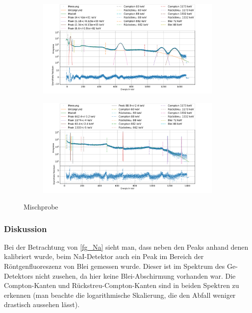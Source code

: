 \documentclass[
	a4paper,
	12pt,
	pagesize,
	ngerman
]{scrartcl}
\begin{document}
\begin{figure}[H]
		\centering
		\begin{subfigure}[c]{\textwidth}
			\centering
			\includegraphics[width= 1 \linewidth]{img/MixNa.pdf}
		\label{fg_Mix_Na}
		\end{subfigure}
		\begin{subfigure}[c]{\textwidth}
			\centering
			\includegraphics[width= 1 \linewidth]{img/MixGe.pdf}
		\label{fg_Mix_Ge}
		\end{subfigure}
		\caption{Mischprobe}
		\label{fg_Mix}
	\end{figure}

\subsubsection{Diskussion}

Bei der Betrachtung von \cref{fg_Na} sieht man, dass neben den Peaks anhand denen kalibriert wurde, beim NaI-Detektor auch ein Peak im Bereich der Röntgenfluoreszenz von Blei gemessen wurde.
Dieser ist im Spektrum des Ge-Detektors nicht zusehen, da hier keine Blei-Abschirmung vorhanden war.
Die Compton-Kanten und Rückstreu-Compton-Kanten sind in beiden Spektren zu erkennen (man beachte die logarithmische Skalierung, die den Abfall weniger drastisch aussehen lässt).
\end{document}
